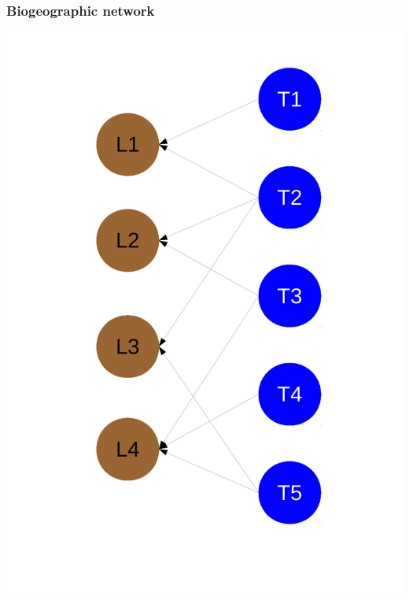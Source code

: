 \documentclass{beamer}
\begin{document}
\begin{frame}
  \frametitle{Biogeographic network}
  \begin{center}
    \includegraphics[height = 0.8\textheight, width = \textwidth,  keepaspectratio = true]{figure/bipartite_graph}
  \end{center}
\end{frame}
\end{document}
